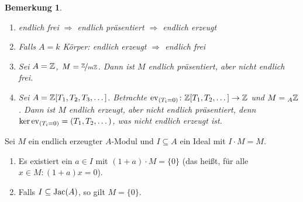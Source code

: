 \documentclass[12pt,a4paper]{scrartcl}
\theoremstyle{cplain}
\theoremstyle{cdef}
\newtheorem{beme}[thmcounter]{Bemerkung}
\begin{document}
\begin{beme}\label{bem:2.17}
	\leavevmode
	\begin{enumerate}
		\item endlich frei $\Rightarrow$ endlich präsentiert $\Rightarrow$ endlich erzeugt
		\item Falls $A = k$ Körper: endlich erzeugt $\Rightarrow$ endlich frei
		\item Sei $A = \mathbb Z$, $M = \nicefrac{\mathbb Z}{m\mathbb Z}$. Dann ist $M$ endlich präsentiert, aber nicht endlich frei.
		\item Sei $A = \mathbb Z[T_1,T_2,T_3,\dots]$. Betrachte $\operatorname{ev}_{(T_i = 0)}\colon \mathbb Z[T_1,T_2,\dots]\to \mathbb Z$ und $M = {}_A\mathbb Z$. Dann ist $M$ endlich erzeugt, aber nicht endlich präsentiert, denn $\operatorname{ker}\operatorname{ev}_{(T_i = 0)}= (T_1,T_2,\dots)$, was nicht endlich erzeugt ist.
	\end{enumerate}
\end{beme}
\begin{lem} \label{lem:nakayama}
	Sei $M$ ein endlich erzeugter $A$-Modul und $I\subseteq A$ ein Ideal mit $I \cdot M = M$.
	\begin{enumerate}
		\item \label{lem:nakayama:i} Es existiert ein $a\in I$ mit $(1+a)\cdot M = \{0\}$ \textup(das heißt, für alle $x\in M: (1+a)x = 0$\textup).
		\item Falls $I\subseteq\operatorname{Jac}(A)$, so gilt $M = \{0\}$. \label{lem:nakayama:ii}
	\end{enumerate}
\end{lem}
\end{document}
